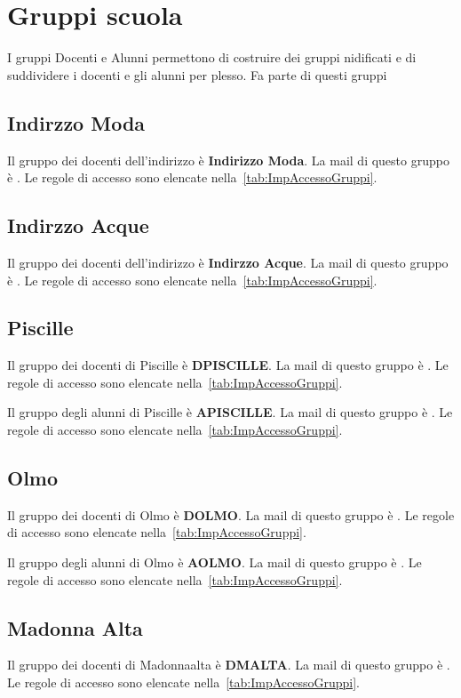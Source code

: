\section{Gruppi scuola}
I gruppi Docenti e Alunni permettono di costruire dei gruppi nidificati e di suddividere i docenti e gli alunni per plesso.  Fa parte di questi gruppi 
\subsection{Indirzzo Moda}
Il gruppo dei docenti dell'indirizzo è \textbf{Indirizzo Moda}. La mail di questo gruppo è . Le  regole di accesso  sono elencate nella~\cref{tab:ImpAccessoGruppi}. 
\subsection{Indirzzo Acque}
Il gruppo dei docenti dell'indirizzo è \textbf{Indirzzo Acque}. La mail di questo gruppo è . Le  regole di accesso sono elencate nella~\cref{tab:ImpAccessoGruppi}.
\subsection{Piscille}
Il gruppo dei docenti di Piscille è \textbf{DPISCILLE}. La mail di questo gruppo è . Le  regole di accesso sono elencate nella~\cref{tab:ImpAccessoGruppi}. 

Il gruppo degli alunni di Piscille è \textbf{APISCILLE}. La mail di questo gruppo è . Le  regole di accesso  sono elencate nella~\cref{tab:ImpAccessoGruppi}. 
\subsection{Olmo}
Il gruppo dei docenti di Olmo è \textbf{DOLMO}. La mail di questo gruppo è . Le  regole di accesso  sono elencate nella~\cref{tab:ImpAccessoGruppi}. 

Il gruppo degli alunni di Olmo è \textbf{AOLMO}. La mail di questo gruppo è . Le  regole di accesso  sono elencate nella~\cref{tab:ImpAccessoGruppi}. 
\subsection{Madonna Alta}
Il gruppo dei docenti di Madonnaalta è \textbf{DMALTA}. La mail di questo gruppo è . Le  regole di accesso  sono elencate nella~\cref{tab:ImpAccessoGruppi}. 

